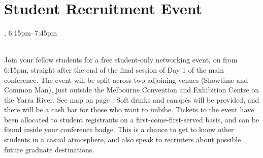 \clearpage
\section{Student Recruitment Event}
\setheaders{}{\daydateyear}

\begin{center}



\daydateyear, 6:15pm--7:45pm \vspace{1em}\\
\StudentLunchLoc \\
\end{center}

Join your fellow students for a free student-only networking event, on
\daydate from 6:15pm, straight after the end of the final session of Day
1 of the main conference. The event will be split across two adjoining
venues (Showtime and Common Man), just outside the Melbourne Convention
and Exhibition Centre on the Yarra River.  
See map on page \pageref{page:surrounds-map}.
Soft drinks and canap\'es
will be provided, and there will be a cash bar for those who want to
imbibe. Tickets to the event have been allocated to student registrants
on a first-come-first-served basis, and can be found inside your
conference badge. This is a chance to get to know other students in a
casual atmosphere, and also speak to recruiters about possible future
graduate destinations.

